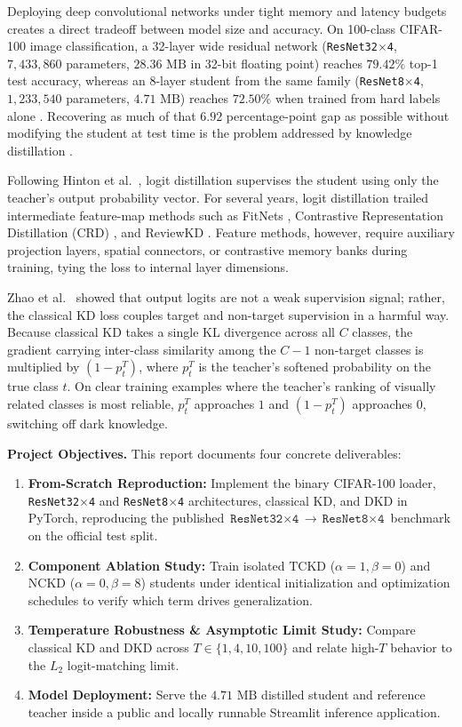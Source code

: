 \documentclass[11pt]{article}
\begin{document}
Deploying deep convolutional networks under tight memory and latency budgets creates a direct tradeoff between model size and accuracy. On 100-class CIFAR-100 image classification, a 32-layer wide residual network (\texttt{ResNet32$\times$4}, \(7{,}433{,}860\) parameters, \(28.36\text{ MB}\) in 32-bit floating point) reaches \(79.42\%\) top-1 test accuracy, whereas an 8-layer student from the same family (\texttt{ResNet8$\times$4}, \(1{,}233{,}540\) parameters, \(4.71\text{ MB}\)) reaches \(72.50\%\) when trained from hard labels alone \cite{zhao2022}. Recovering as much of that \(6.92\) percentage-point gap as possible without modifying the student at test time is the problem addressed by knowledge distillation \cite{bucilua2006,hinton2015}.

Following Hinton et al.\ \cite{hinton2015}, logit distillation supervises the student using only the teacher's output probability vector. For several years, logit distillation trailed intermediate feature-map methods such as FitNets \cite{romero2015}, Contrastive Representation Distillation (CRD) \cite{tian2020}, and ReviewKD \cite{chen2021}. Feature methods, however, require auxiliary projection layers, spatial connectors, or contrastive memory banks during training, tying the loss to internal layer dimensions.

Zhao et al.\ \cite{zhao2022} showed that output logits are not a weak supervision signal; rather, the classical KD loss couples target and non-target supervision in a harmful way. Because classical KD takes a single KL divergence across all \(C\) classes, the gradient carrying inter-class similarity among the \(C-1\) non-target classes is multiplied by \((1 - p_t^T)\), where \(p_t^T\) is the teacher's softened probability on the true class \(t\). On clear training examples where the teacher's ranking of visually related classes is most reliable, \(p_t^T\) approaches \(1\) and \((1 - p_t^T)\) approaches \(0\), switching off dark knowledge.

\textbf{Project Objectives.} This report documents four concrete deliverables:
\begin{enumerate}
    \item \textbf{From-Scratch Reproduction:} Implement the binary CIFAR-100 loader, \texttt{ResNet32$\times$4} and \texttt{ResNet8$\times$4} architectures, classical KD, and DKD in PyTorch, reproducing the published \(\texttt{ResNet32$\times$4} \to \texttt{ResNet8$\times$4}\) benchmark on the official test split.
    \item \textbf{Component Ablation Study:} Train isolated \(\mathrm{TCKD}\) (\(\alpha=1, \beta=0\)) and \(\mathrm{NCKD}\) (\(\alpha=0, \beta=8\)) students under identical initialization and optimization schedules to verify which term drives generalization.
    \item \textbf{Temperature Robustness \& Asymptotic Limit Study:} Compare classical KD and DKD across \(T \in \{1, 4, 10, 100\}\) and relate high-\(T\) behavior to the \(L_2\) logit-matching limit.
    \item \textbf{Model Deployment:} Serve the \(4.71\text{ MB}\) distilled student and reference teacher inside a public and locally runnable Streamlit inference application.
\end{enumerate}
\end{document}
